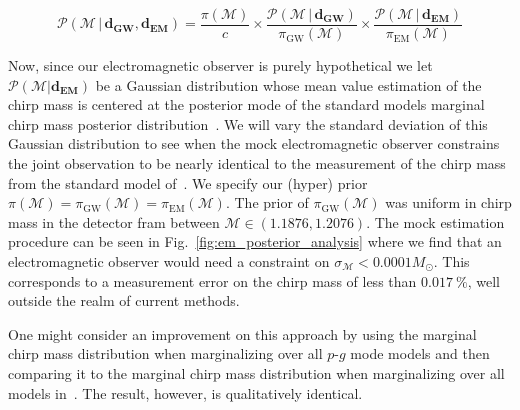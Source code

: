 \begin{equation}
    \mathcal{P}(\mathcal{M} \, |  \, \mathbf{d_{GW}}, \mathbf{d_{EM}}) = \frac{\pi(\mathcal{M})}{c} \times \frac{\mathcal{P}(\mathcal{M} \, | \, \mathbf{d_{GW}})}{\pi_{\mathrm{GW}}(\mathcal{M})} \times \frac{\mathcal{P}(\mathcal{M} \, | \, \mathbf{d_{EM}})}{\pi_{\mathrm{EM}}(\mathcal{M})}
\end{equation}

Now, since our electromagnetic observer is purely hypothetical we let $\mathcal{P}(\mathcal{M} | \mathbf{d_{EM}})$ be a Gaussian distribution whose mean value estimation of the chirp mass is centered at the posterior mode of the standard models marginal chirp mass posterior distribution~\cite{de2018tidal}. We will vary the standard deviation of this Gaussian distribution to see when the mock electromagnetic observer constrains the joint observation to be nearly identical to the measurement of the chirp mass from the standard model of~\cite{2018tidal}. We specify our (hyper) prior $\pi(\mathcal{M}) = \pi_{\mathrm{GW}}(\mathcal{M}) = \pi_{\mathrm{EM}}(\mathcal{M})$. The prior of $\pi_{\mathrm{GW}}(\mathcal{M})$ was uniform in chirp mass in the detector fram between $\mathcal{M} \in (1.1876, 1.2076)$. The mock estimation procedure can be seen in Fig.~\ref{fig:em_posterior_analysis} where we find that an electromagnetic observer would need a constraint on $\sigma_{\mathcal{M}} < 0.0001 M_{\odot}$. This corresponds to a measurement error on the chirp mass of less than $0.017~\%$, well outside the realm of current methods.

One might consider an improvement on this approach by using the marginal chirp mass distribution when marginalizing over all $p$-$g$ mode models and then comparing it to the marginal chirp mass distribution when marginalizing over all models in~\cite{de2018tidal}. The result, however, is qualitatively identical.

